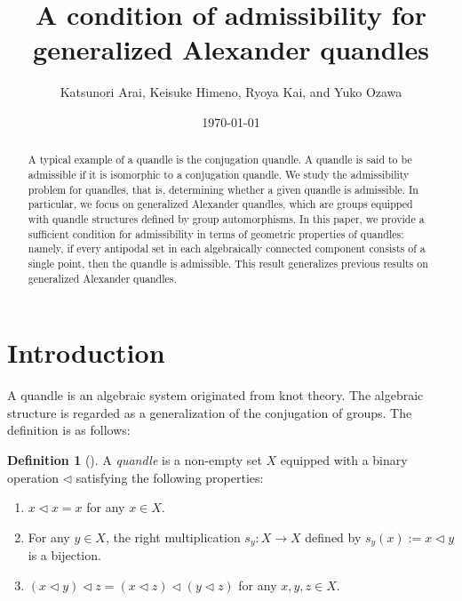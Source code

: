 \documentclass[dvipdfmx,12pt]{amsart}
\date{\today}
\title{A condition of admissibility for generalized Alexander quandles} %
\author{Katsunori Arai, Keisuke Himeno, Ryoya Kai, and Yuko Ozawa} %
\theoremstyle{plain}
\theoremstyle{definition}
\newtheorem{dfn}[thm]{Definition}
\newcommand{\qop}{\triangleleft}
\begin{document}
\begin{abstract}
A typical example of a quandle is the conjugation quandle.
A quandle is said to be admissible if it is isomorphic to a conjugation quandle.
We study the admissibility problem for quandles, that is, determining whether a given quandle is admissible.
In particular,
we focus on generalized Alexander quandles, 
which are groups equipped with quandle structures defined by group automorphisms.
In this paper,
we provide a sufficient condition for admissibility in terms of geometric properties of quandles:
namely, if every antipodal set in each algebraically connected component consists of a single point, then the quandle is admissible. 
This result generalizes previous results on generalized Alexander quandles.
\end{abstract}

\maketitle
\section{Introduction}\label{sec:Intro}

A quandle is an algebraic system originated from knot theory.
The algebraic structure is regarded as a generalization of the conjugation of groups.
The definition is as follows:
\begin{dfn}[\cite{Joyce-1982-ClassifyingInvariantKnotsKnota,Matveev-1982-DistributiveGroupoidsKnotTheorya}]\label{def:quandle}
  A \emph{quandle} is a non-empty set $X$ equipped with a binary operation $\qop$ satisfying the following properties:
  \begin{enumerate}
    \item[Q1] $x \qop x = x$ for any $x \in X$.

    \item[Q2] For any $y \in X$, the right multiplication $s_y: X \to X$ defined by $s_y(x) := x \qop y$ is a bijection. 

    \item[Q3] $(x \qop y) \qop z = (x \qop z) \qop (y \qop z)$ for any $x, y, z \in X$.
  \end{enumerate}
\end{dfn}
\end{document}
